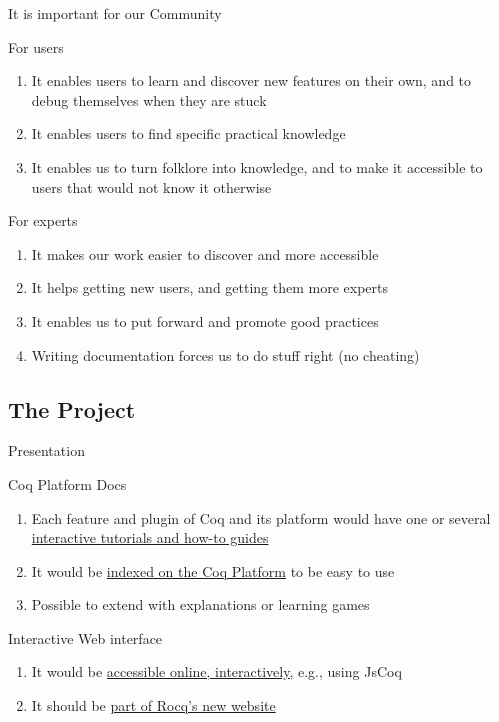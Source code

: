 \documentclass[10pt]{beamer}
\begin{document}
\begin{frame}{It is important for our Community}
\begin{tcbProp}{For users}
  \begin{enumerate}
    \item It enables users to learn and discover new features on their own,
          and to debug themselves when they are stuck
    \item<2-> It enables users to find specific practical knowledge
    \item<3-> It enables us to turn folklore into knowledge, and to make it
          accessible to users that would not know it otherwise
  \end{enumerate}
\end{tcbProp}
\begin{tcbProp}{For experts}
  \begin{enumerate}
    \item<4-> It makes our work easier to discover and more accessible
    \item<5-> It helps getting new users, and getting them more experts
    \item<6-> It enables us to put forward and promote good practices
    \item<7-> Writing documentation forces us to do stuff right (no cheating)
  \end{enumerate}
\end{tcbProp}
\end{frame}

\subsection{The Project}

\begin{frame}{Presentation}
  \begin{tcbObj}{Coq Platform Docs}
    \begin{enumerate}
      \item<1-> Each feature and plugin of Coq and its platform would have one
            or several \ul{interactive tutorials and how-to guides}
      \item<2-> It would be \ul{indexed on the Coq Platform} to be easy to use
      \item<3-> Possible to extend with explanations or learning games
    \end{enumerate}
  \end{tcbObj}
  \begin{tcbObj}{Interactive Web interface}
    \begin{enumerate}
      \item<5-> It would be \ul{accessible online, interactively,} e.g., using JsCoq
      \item<6-> It should be \ul{part of Rocq's new website}
    \end{enumerate}
  \end{tcbObj}
\end{frame}
\end{document}
